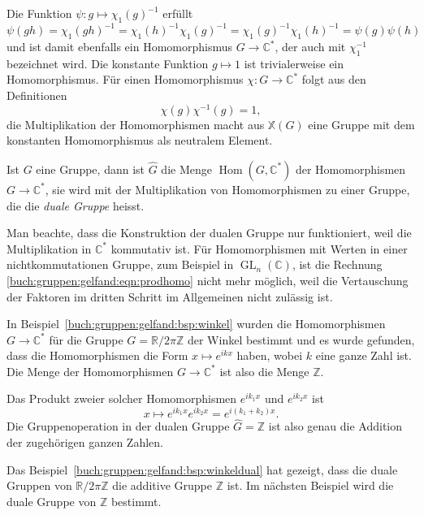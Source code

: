 Die Funktion $\psi\colon g\mapsto \chi_1(g)^{-1}$ erfüllt
\[
\psi(gh)
=
\chi_1(gh)^{-1}
=
\chi_1(h)^{-1}
\chi_1(g)^{-1}
=
\chi_1(g)^{-1}
\chi_1(h)^{-1}
=
\psi(g)
\psi(h)
\]
und ist damit ebenfalls ein Homomorphismus $G\to\mathbb{C}^*$, der auch
mit $\chi_1^{-1}$ bezeichnet wird.
Die konstante Funktion $g\mapsto 1$ ist trivialerweise ein Homomorphismus.
Für einen Homomorphismus $\chi\colon G\to\mathbb{C}^*$ folgt aus den
Definitionen
\[
\chi(g)\chi^{-1}(g) = 1,
\]
die Multiplikation der Homomorphismen macht aus $\mathbb{X}(G)$ eine
Gruppe mit dem konstanten Homomorphismus als neutralem Element.

\begin{definition}
Ist $G$ eine Gruppe, dann ist $\hat{G}$ die Menge
$\operatorname{Hom}(G,\mathbb{C}^*)$
der Homomorphismen
$G\to\mathbb{C}^*$, sie wird mit der Multiplikation von Homomorphismen
zu einer Gruppe, die die {\em duale Gruppe} heisst.
%
%
\end{definition}

Man beachte, dass die Konstruktion der dualen Gruppe nur funktioniert,
weil die Multiplikation in $\mathbb{C}^*$ kommutativ ist.
Für Homomorphismen mit Werten in einer nichtkommutationen Gruppe, zum
Beispiel in $\operatorname{GL}_n(\mathbb{C})$, ist die Rechnung
\eqref{buch:gruppen:gelfand:eqn:prodhomo} nicht mehr möglich, weil
die Vertauschung der Faktoren im dritten Schritt im Allgemeinen
nicht zulässig ist.

\begin{beispiel}
\label{buch:gruppen:gelfand:bsp:winkeldual}
In Beispiel~\ref{buch:gruppen:gelfand:bsp:winkel} wurden die Homomorphismen
$G\to\mathbb{C}^*$ für die Gruppe $G=\mathbb{R}/2\pi\mathbb{Z}$ der
Winkel bestimmt und es wurde gefunden, dass die Homomorphismen die Form
$x\mapsto e^{ikx}$ haben, wobei $k$ eine ganze Zahl ist.
Die Menge der Homomorphismen $G\to\mathbb{C}^*$ ist also die Menge $\mathbb{Z}$.

Das Produkt zweier solcher Homomorphismen $e^{ik_1x}$ und $e^{ik_2x}$ ist
\[
x\mapsto e^{ik_1x}e^{ik_2x} = e^{i(k_1+k_2)x}.
\]
Die Gruppenoperation in der dualen Gruppe $\hat{G}=\mathbb{Z}$ ist also
genau die Addition der zugehörigen ganzen Zahlen.
\end{beispiel}

Das Beispiel~\ref{buch:gruppen:gelfand:bsp:winkeldual} hat gezeigt,
dass die duale Gruppen von $\mathbb{R}/2\pi\mathbb{Z}$ die additive
Gruppe $\mathbb{Z}$ ist.
Im nächsten Beispiel wird die duale Gruppe von $\mathbb{Z}$ bestimmt.

